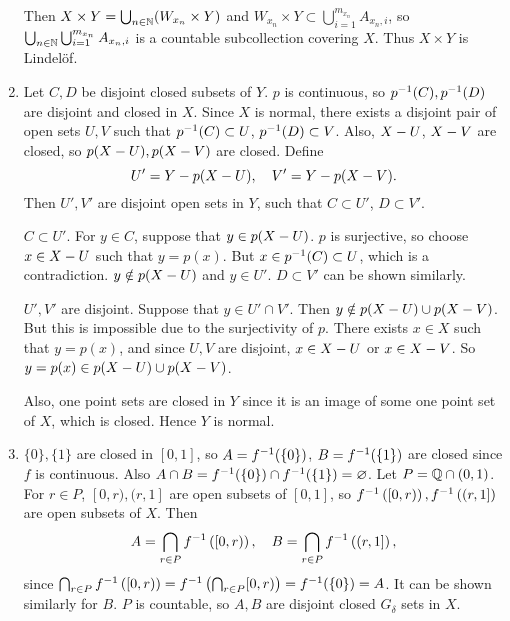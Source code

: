 \documentclass[12pt]{report}
\newcommand{\prob}[1]{\item[\large\textbf{\sffamily #1.}]}
\begin{document}
\begin{enumerate}
    Then \(X \times Y = \bigcup_{n\in \mathbb{N}} (W_{x_n} \times Y)\) and \(W_{x_n} \times Y \subset \bigcup_{i=1}^{m_{x_n}} A_{x_n, i}\), so \(\bigcup_{n\in \mathbb{N}} \bigcup_{i=1}^{m_{x_n}} A_{x_n, i}\) is a countable subcollection covering \(X\). Thus \(X \times Y\) is Lindelöf.

    \prob{3} Let \(C, D\) be disjoint closed subsets of \(Y\). \(p\) is continuous, so \(p^{-1}(C), p^{-1}(D)\) are disjoint and closed in \(X\). Since \(X\) is normal, there exists a disjoint pair of open sets \(U, V\) such that \(p^{-1}(C) \subset U\), \(p^{-1}(D) \subset V\). Also, \(X - U\), \(X - V\) are closed, so \(p(X- U), p(X- V)\) are closed. Define
    \[
        U' = Y - p(X - U), \quad V' = Y - p(X - V).
    \]
    Then \(U', V'\) are disjoint open sets in \(Y\), such that \(C \subset U'\), \(D \subset V'\).

    \(C \subset U'\). For \(y \in C\), suppose that \(y \in p(X - U)\). \(p\) is surjective, so choose \(x \in X - U\) such that \(y = p(x)\). But \(x \in p^{-1}(C) \subset U\), which is a contradiction. \(y \notin p(X - U)\) and \(y \in U'\). \(D \subset V'\) can be shown similarly.

    \(U', V'\) are disjoint. Suppose that \(y \in U' \cap V'\). Then \(y \notin p(X- U) \cup p(X - V)\). But this is impossible due to the surjectivity of \(p\). There exists \(x \in X\) such that \(y = p(x)\), and since \(U, V\) are disjoint, \(x \in X - U\) or \(x \in X - V\). So \(y = p(x) \in p(X - U) \cup p(X- V)\).

    Also, one point sets are closed in \(Y\) since it is an image of some one point set of \(X\), which is closed. Hence \(Y\) is normal.

    \prob{4} \note{\mimp} \(\{0\}, \{1\}\) are closed in \([0, 1]\), so \(A = f^{-1}(\{0\})\), \(B = f^{-1}(\{1\})\) are closed since \(f\) is continuous. Also \(A \cap B = f^{-1}(\{0\}) \cap f^{-1}(\{1\}) = \varnothing\). Let \(P = \mathbb{Q} \cap (0, 1)\). For \(r \in P\), \([0, r), (r, 1]\) are open subsets of \([0, 1]\), so \(f^{-1}\left( [0, r) \right), f^{-1}\left( (r, 1] \right)\) are open subsets of \(X\). Then
    \[
        A = \bigcap_{r \in P} f^{-1}\left( [0, r) \right), \quad B = \bigcap_{r\in P} f^{-1}\left( (r, 1] \right),
    \]
    since \(\bigcap_{r\in P} f^{-1}\left( [0, r) \right) = f^{-1}\left( \bigcap_{r \in P} [0, r) \right) = f^{-1}(\{0\}) = A\). It can be shown similarly for \(B\). \(P\) is countable, so \(A, B\) are disjoint closed \(G_\delta\) sets in \(X\).


\end{enumerate}
\end{document}
